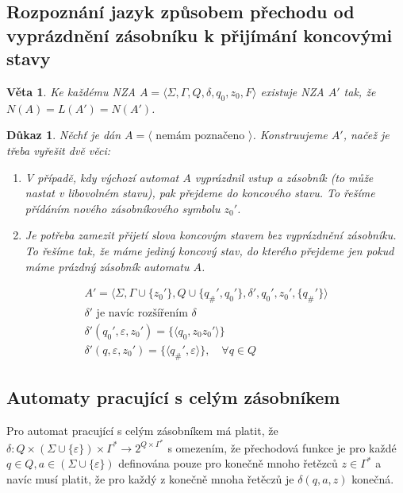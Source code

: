 \documentclass[10pt, a4paper, titlepage]{article}
\theoremstyle{note}
\newtheorem{veta}{Věta}
\newtheorem{dukaz}{Důkaz}
\begin{document}
\subsection{Rozpoznání jazyk způsobem přechodu od vyprázdnění zásobníku k přijímání koncovými stavy}
\begin{veta}
Ke každému NZA $A = \langle \Sigma, \Gamma, Q, \delta, q_0, z_0, F \rangle$ existuje NZA $A'$ tak, že $N(A) = L(A') = N(A')$.
\end{veta}
\begin{dukaz}
Něchť je dán $A = \langle \text{ nemám poznačeno } \rangle$. Konstruujeme $A'$, načež je třeba vyřešit dvě věci:
\begin{enumerate}
\item
V případě, kdy výchozí automat $A$ vyprázdnil vstup a zásobník (to může nastat v libovolném stavu), pak přejdeme do koncového
stavu. To řešíme přídáním nového zásobníkového symbolu $z_0'$.

\item
Je potřeba zamezit přijetí slova koncovým stavem bez vyprázdnění zásobníku. To řešíme tak, že máme jediný koncový stav, do kterého přejdeme
jen pokud máme prázdný zásobník automatu $A$.
\end{enumerate}
\begin{gather*}
A' = \langle \Sigma, \Gamma \cup \lbrace z_0' \rbrace, Q \cup \lbrace q_\#', q_0' \rbrace, \delta', q_0', z_0', \lbrace q_\#' \rbrace \rangle \\
\delta' \text{ je navíc rozšířením } \delta \\
\delta'(q_0', \varepsilon, z_0') = \lbrace \langle q_0, z_0z_0' \rangle \rbrace \\
\delta'(q, \varepsilon, z_0') = \lbrace \langle q_\#', \varepsilon \rangle \rbrace, \quad \forall q \in Q
\end{gather*}
\end{dukaz}

\subsection{Automaty pracující s celým zásobníkem}
Pro automat pracující s celým zásobníkem má platit, že $\delta : Q \times (\Sigma \cup \lbrace \varepsilon \rbrace) \times \Gamma^*
 \rightarrow 2^{Q \times \Gamma^*}$ s omezením, že přechodová funkce je pro každé $q \in Q, a \in (\Sigma \cup \lbrace \varepsilon \rbrace)$ definována
pouze pro konečně mnoho řetězců $z \in \Gamma^*$ a navíc musí platit, že pro každý z konečně mnoha řetěczů je $\delta(q, a, z)$ konečná.
\end{document}
